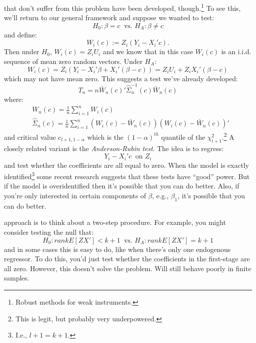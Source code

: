 \documentclass{tufte-book}
\theoremstyle{mytheoremstyle}
\theoremstyle{mylemstyle}
\theoremstyle{mydefstyle}
\begin{document}
 that don't suffer from this problem have been developed, though.\footnote{Robust methods for weak instruments.} To see this, we'll return to our general framework and suppose we wanted to test:
	\[H_0: \beta = c\ \text{ vs. } H_A: \beta \ne c\]
and define:
	\[W_i(c) := Z_i(Y_i - X_i'c) \text{.}\]
Then under \(H_0\), \(W_i(c) = Z_i U_i\) and we know that in this case \(W_i(c)\) is an i.i.d. sequence of mean zero random vectors. Under \(H_A\): 
	\[W_i(c) = Z_i(Y_i - X_i'\beta + X_i'(\beta - c)) = Z_i U_i + Z_i X_i'(\beta - c)\]
which may not have mean zero. This suggests a test we've already developed:
	\[T_n = n \bar{W}_n(c)' \hat{\Sigma}_n^{-1}(c) \bar{W}_n(c)\]
where:
	\begin{align*}
		& W_n(c) = \frac{1}{n} \sum_{i=1}^n W_i(c) \\
		& \hat{\Sigma}_n(c) = \frac{1}{n} \sum_{i=1}^n (W_i(c) - \bar{W}_n(c))(W_i(c) - \bar{W}_n(c))'
	\end{align*}
and critical value \(c_{l+1, 1-\alpha}\) which is the \((1-\alpha)^{th}\) quantile of the \(\chi_{l+1}^2\).\footnote{This is legit, but probably very underpowered.} A closely related variant is the \emph{Anderson-Rubin test}. The idea is to regress:
	\[Y_i - X_i'c\ \text{ on } Z_i\]
and test whether the coefficients are all equal to zero. When the model is exactly identified\footnote{I.e., \(l+1 = k+1\).} some recent research suggests that these tests have ``good'' power. But if the model is overidentified then it's possible that you can do better. Also, if you're only interested in certain components of \(\beta\), e.g., \(\beta_1\), it's possible that you can do better.
	
 approach is to think about a two-step procedure. For example, you might consider testing the null that:
	\[H_0: rank E[ZX'] < k +1\ \text{ vs. } H_A: rank E[ZX'] = k+1\]
and in some cases this is easy to do, like when there's only one endogenous regressor. To do this, you'd just test whether the coefficients in the first-stage are all zero. However, this doesn't solve the problem. Will still behave poorly in finite samples. 
\end{document}

